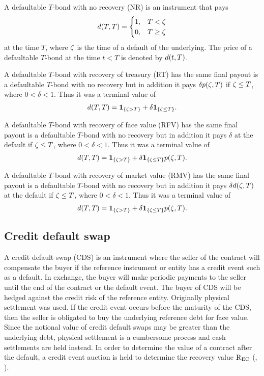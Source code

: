 A defaultable $T$-bond with no recovery (NR) is an instrument that pays
	\begin{align}
		d(T,T) = \begin{cases} 1, & T < \zeta \\ 0, & T \geq \zeta \end{cases}
	\end{align}
at the time $T$, where $\zeta$ is the time of a default of the underlying. The price of a defaultable $T$-bond at the time $t < T$ is denoted by $d(t,T)$.

A defaultable $T$-bond with recovery of treasury (RT) has the same final payout is a defaultable $T$-bond with no recovery but in addition it pays $\delta p(\zeta, T)$ if $\zeta \leq T$, where $0 < \delta < 1$. Thus it was a terminal value of
	\begin{align}
		d(T,T) = \boldsymbol{1}_{ \{ \zeta > T \} } + \delta \boldsymbol{1}_{ \{ \zeta \leq T \} } .
	\end{align}

A defaultable $T$-bond with recovery of face value (RFV) has the same final payout is a defaultable $T$-bond with no recovery but in addition it pays $\delta$ at the default if $\zeta \leq T$, where $0 < \delta < 1$. Thus it was a terminal value of
	\begin{align}
		d(T,T) = \boldsymbol{1}_{ \{ \zeta > T \} } + \delta \boldsymbol{1}_{ \{ \zeta \leq T \} } p(\zeta,T) .
	\end{align}
	
A defaultable $T$-bond with recovery of market value (RMV) has the same final payout is a defaultable $T$-bond with no recovery but in addition it pays $\delta d(\zeta,T)$ at the default if $\zeta \leq T$, where $0 < \delta < 1$. Thus it was a terminal value of
\begin{align}
d(T,T) = \boldsymbol{1}_{ \{ \zeta > T \} } + \delta \boldsymbol{1}_{ \{ \zeta \leq T \} } p(\zeta,T) .
\end{align}

\subsection{Credit default swap}

A credit default swap (CDS) is an instrument where the seller of the contract will compensate the buyer if the reference instrument or entity has a credit event such as a default. In exchange, the buyer will make periodic payments to the seller until the end of the contract or the default event. The buyer of CDS will be hedged against the credit risk of the reference entity. Originally physical settlement was used. If the credit event occurs before the maturity of the CDS, then the seller is obligated to buy the underlying reference debt for face value. Since the notional value of credit default swaps may be greater than the underlying debt, physical settlement is a cumbersome process and cash settlements are held instead. In order to determine the value of a contract after the default, a credit event auction is held to determine the recovery value $\mathrm{R_{EC}}$ (\cite{ISDAbigbang}, \cite{BISquarterlyreview2010}).

